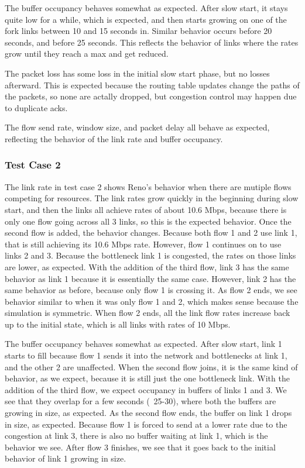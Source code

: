 The buffer occupancy behaves somewhat as expected. After slow start, it
stays quite low for a while, which is expected, and then starts growing
on one of the fork links between 10 and 15 seconds in. Similar behavior
occurs before 20 seconds, and before 25 seconds. This reflects the behavior of
links where the rates grow until they reach a max and get reduced.

The packet loss has some loss in the initial slow start phase, but no losses
afterward. This is expected because the routing table updates change the paths
of the packets, so none are actally dropped, but congestion control may happen
due to duplicate acks.

The flow send rate, window size, and packet delay all behave as expected,
reflecting the behavior of the link rate and buffer occupancy.

\subsubsection{Test Case 2}
The link rate in test case 2 shows Reno's behavior when there are mutiple
flows competing for resources.
The link rates grow quickly in the beginning during slow start,
and then the links all achieve rates of about 10.6 Mbps, because there is only
one flow going across all 3 links, so this is the expected behavior.
Once the second flow is added, the behavior changes. Because both flow 1 and
2 use link 1, that is still achieving its 10.6 Mbps rate. However, flow 1
continues on to use links 2 and 3. Because the bottleneck link 1 is
congested, the rates on those links are lower, as expected. With the addition
of the third flow, link 3 has the same behavior as link 1 because it is
essentially the same case. However, link 2 has the same behavior as before,
because only flow 1 is crossing it. As flow 2 ends, we see behavior similar
to when it was only flow 1 and 2, which makes sense because the simulation is
symmetric. When flow 2 ends, all the link flow rates increase back up to
the initial state, which is all links with rates of 10 Mbps.

The buffer occupancy behaves somewhat as expected. After slow start,
link 1 starts to fill because flow 1 sends it into the network and bottlenecks
at link 1, and the other 2 are unaffected. When the second flow joins, it is
the same kind of behavior, as we expect, because it is still just the one
bottleneck link. With the addition of the third flow, we expect occupancy
in buffers of links 1 and 3. We see that they overlap for a few seconds
(~25-30), where both the buffers are growing in size, as expected. As the
second flow ends, the buffer on link 1 drops in size, as expected. Because
flow 1 is forced to send at a lower rate due to the congestion at link 3, there
is also no buffer waiting at link 1, which is the behavior we see. After
flow 3 finishes, we see that it goes back to the initial behavior of link
1 growing in size.

